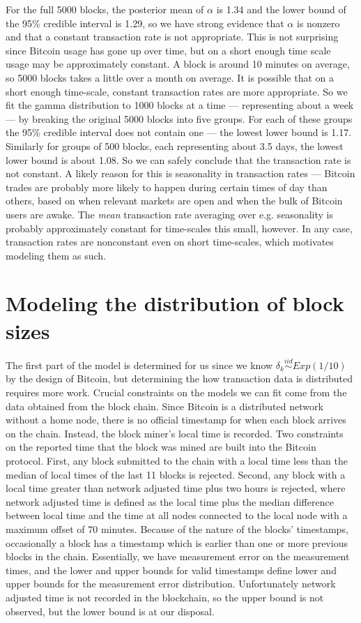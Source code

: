 \documentclass{article}
\begin{document}
For the full 5000 blocks, the posterior mean of $\alpha$ is 1.34 and the lower bound of the 95\% credible interval is 1.29, so we have strong evidence that $\alpha$ is nonzero and that a constant transaction rate is not appropriate. This is not surprising since Bitcoin usage has gone up over time, but on a short enough time scale usage may be approximately constant. A block is around 10 minutes on average, so 5000 blocks takes a little over a month on average. It is possible that on a short enough time-scale, constant transaction rates are more appropriate. So we fit the gamma distribution to 1000 blocks at a time --- representing about a week --- by breaking the original 5000 blocks into five groups. For each of these groups the 95\% credible interval does not contain one --- the lowest lower bound is 1.17. Similarly for groups of 500 blocks, each representing about 3.5 days, the lowest lower bound is about 1.08. So we can safely conclude that the transaction rate is not constant. A likely reason for this is seasonality in transaction rates --- Bitcoin trades are probably more likely to happen during certain times of day than others, based on when relevant markets are open and when the bulk of Bitcoin users are awake. The {\it mean} transaction rate averaging over e.g. seasonality is probably approximately constant for time-scales this small, however. In any case, transaction rates are nonconstant even on short time-scales, which motivates modeling them as such.

\section{Modeling the distribution of block sizes}

The first part of the model is determined for us since we know $\delta_k\stackrel{iid}{\sim} Exp(1/10)$ by the design of Bitcoin, but determining the how transaction data is distributed requires more work. Crucial constraints on the models we can fit come from the data obtained from the block chain. Since Bitcoin is a distributed network without a home node, there is no official timestamp for when each block arrives on the chain. Instead, the block miner's local time is recorded. Two constraints on the reported time that the block was mined are built into the Bitcoin protocol. First, any block submitted to the chain with a local time less than the median of local times of the last 11 blocks is rejected. Second, any block with a local time greater than network adjusted time plus two hours is rejected, where network adjusted time is defined as the local time plus the median difference between local time and the time at all nodes connected to the local node with a maximum offset of 70 minutes. Because of the nature of the blocks' timestamps, occasionally a block has a timestamp which is earlier than one or more previous blocks in the chain. Essentially, we have measurement error on the measurement times, and the lower and upper bounds for valid timestamps define lower and upper bounds for the measurement error distribution. Unfortunately network adjusted time is not recorded in the blockchain, so the upper bound is not observed, but the lower bound is at our disposal.
\end{document}
